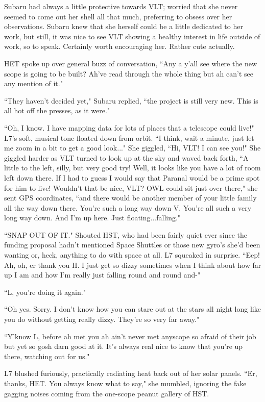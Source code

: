 \documentclass[12pt]{iopart}
\begin{document}
Subaru had always a little protective towards VLT; worried that she never seemed to come out her shell all that much, preferring to obsess over her observations. Subaru knew that she herself could be a little dedicated to her work, but still, it was nice to see VLT showing a healthy interest in life outside of work, so to speak. Certainly worth encouraging her. Rather cute actually.

HET spoke up over general buzz of conversation, ``Any a y'all see where the new scope is going to be built? Ah've read through the whole thing but ah can't see any mention of it."

``They haven't decided yet," Subaru replied, ``the project is still very new. This is all hot off the presses, as it were."

``Oh, I know. I have mapping data for lots of places that a telescope could live!" L7's soft, musical tone floated down from orbit. ``I think, wait a minute, just let me zoom in a bit to get a good look..." She giggled, ``Hi, VLT! I can see you!" She giggled harder as VLT turned to look up at the sky and waved back forth, ``A little to the left, silly, but very good try! Well, it looks like you have a lot of room left down there. If I had to guess I would say that Paranal would be a prime spot for him to live! Wouldn't that be nice, VLT? OWL could sit just over there," she sent GPS coordinates, ``and there would be another member of your little family all the way down there. You're such a long way down V. You're all such a very long way down. And I'm up here. Just floating...falling."

``SNAP OUT OF IT." Shouted HST, who had been fairly quiet ever since the funding proposal hadn't mentioned Space Shuttles or those new gyro's she'd been wanting or, heck, anything to do with space at all. L7 squeaked in surprise. ``Eep! Ah, oh, er thank you H. I just get so dizzy sometimes when I think about how far up I am and how I'm really just falling round and round and-"

``L, you're doing it again."

``Oh yes. Sorry. I don't know how you can stare out at the stars all night long like you do without getting really dizzy. They're so very far away."

``Y'know L, before ah met you ah ain't never met anyscope so afraid of their job but yet so gosh darn good at it. It's always real nice to know that you're up there, watching out for us."

L7 blushed furiously, practically radiating heat back out of her solar panels. ``Er, thanks, HET. You always know what to say," she mumbled, ignoring the fake gagging noises coming from the one-scope peanut gallery of HST.
\end{document}
